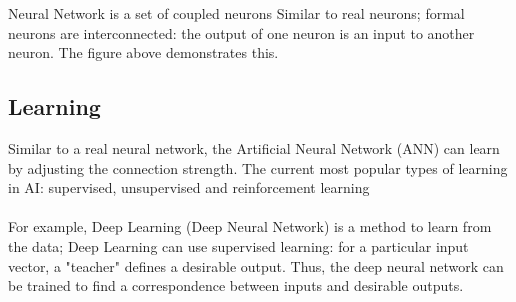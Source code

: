 Neural Network is a set of coupled neurons Similar to real neurons; formal neurons are interconnected: the output of one neuron is an input to another neuron. The figure above demonstrates this.
\subsection{Learning}
Similar to a real neural network, the Artificial Neural Network (ANN) can learn by adjusting the connection strength. The current most popular types of learning in AI: supervised, unsupervised and reinforcement learning 
\\\\
For example, Deep Learning (Deep Neural Network) is a method to learn from the data; Deep Learning can use supervised learning: for a particular input vector, a "teacher" defines a desirable output. Thus, the deep neural network can be trained to find a correspondence between inputs and desirable outputs. 

